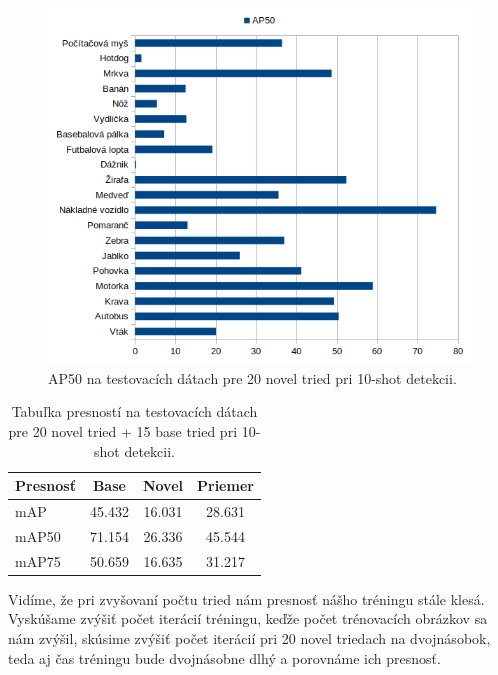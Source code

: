 \begin{figure}[H]
\centering
\includegraphics[width=\textwidth]{images/20novel_classes_chart.png}
\caption{AP50 na testovacích dátach pre 20 novel tried pri 10-shot detekcii.}
\label{fig:image613}
\end{figure}

\begin{table}[H]
\begin{tabular}{|l|c|c|c|}
\hline
\textbf{Presnosť} & \textbf{Base} & \textbf{Novel} & \textbf{Priemer} \\
\hline
mAP & 45.432 & 16.031 & 28.631 \\
mAP50 & 71.154 & 26.336 & 45.544 \\
mAP75 & 50.659 & 16.635 & 31.217 \\
\hline
\end{tabular}
\centering
\caption{Tabuľka presností na testovacích dátach pre 20 novel tried + 15 base tried pri 10-shot detekcii.}
\label{tab:table62}
\end{table}

Vidíme, že pri zvyšovaní počtu tried nám presnosť nášho tréningu stále klesá. Vyskúšame zvýšiť počet iterácií tréningu, keďže počet trénovacích obrázkov sa nám zvýšil, skúsime zvýšiť počet iterácií pri 20 novel triedach na dvojnásobok, teda aj čas tréningu bude dvojnásobne dlhý a porovnáme ich presnosť. 

